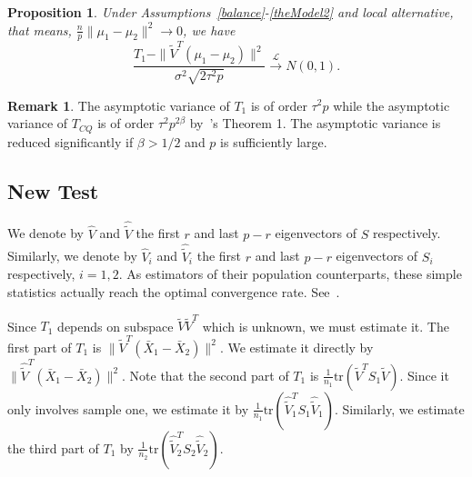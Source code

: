 \documentclass[review]{elsarticle}
\theoremstyle{plain}
\newtheorem{proposition}{\quad\quad Proposition}
\theoremstyle{definition}
\newtheorem{remark}{\quad\quad Remark}
\theoremstyle{remark}
\begin{document}
\begin{proposition}\label{oracleTheorem}
    Under Assumptions~\ref{balance}-\ref{theModel2} and local alternative, that means, $\frac{n}{p}\|\mu_1-\mu_2\|^2\to 0$, we have 
    \begin{equation*}
        \frac{T_1-\|\tilde{V}^T(\mu_1-\mu_2)\|^2}
        {\sigma^2\sqrt{2\tau^2 p}}\xrightarrow{\mathcal{L}}N(0,1).
    \end{equation*}
\end{proposition}

\begin{remark}
    The asymptotic variance of $T_1$ is of order $\tau^2 p$ while the asymptotic variance of $T_{CQ}$ is of order $\tau^2 p^{2\beta}$ by~\cite{Chen2010A}'s Theorem 1. The asymptotic variance is reduced significantly if $\beta>1/2$ and $p$ is sufficiently large.
\end{remark}




\subsection{New Test}
We denote by $\hat{V}$ and $\hat{\tilde{V}}$ the first $r$ and last $p-r$ eigenvectors of $S$ respectively.
Similarly, we denote by  $\hat{V}_i$ and $\hat{\tilde{V}}_i$ the first $r$ and last $p-r$ eigenvectors of $S_i$ respectively, $i=1,2$.
 As estimators of their population counterparts, these simple statistics actually reach the optimal convergence rate. See~\cite{Cai2012Sparse}.

Since $T_1$ depends on subspace $\tilde{V}\tilde{V}^T$ which is unknown, we must estimate it.
The first part of $T_1$ is $\|\tilde{V}^T (\bar{X}_1-\bar{X}_2)\|^2$.
We estimate it directly by $\|\hat{\tilde{V}}^T (\bar{X}_1-\bar{X}_2)\|^2$.
Note that the second part of $T_1$ is $\frac{1}{n_1}\mathrm{tr}(\tilde{V}^T S_1\tilde{V})$. Since it only involves sample one,
we estimate it by $\frac{1}{n_1}\mathrm{tr}(\hat{\tilde{V}}_1^T S_1\hat{\tilde{V}}_1)$. Similarly, we estimate the third part of $T_1$ by $\frac{1}{n_2}\mathrm{tr}(\hat{\tilde{V}}_2^T S_2\hat{\tilde{V}}_2)$.
\end{document}
